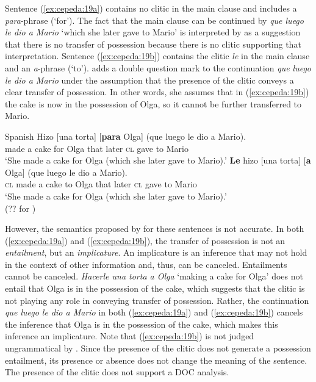 \documentclass[output=paper,colorlinks,citecolor=brown]{./langscibook}
\begin{document}
Sentence (\ref{ex:cepeda:19a}) contains no clitic in the main clause and includes a \textit{para}-phrase (‘for’). The fact that the main clause can be continued by \textit{que luego le dio a Mario} ‘which she later gave to Mario’ is interpreted by \citeauthor{Demonte1995} as a suggestion that there is no transfer of possession because there is no clitic supporting that interpretation. Sentence (\ref{ex:cepeda:19b}) contains the clitic \textit{le} in the main clause and an \textit{a}-phrase (‘to’). \citeauthor{Demonte1995} adds a double question mark to the continuation \textit{que luego le dio a Mario} under the assumption that the presence of the clitic conveys a clear transfer of possession. In other words, she assumes that in (\ref{ex:cepeda:19b}) the cake is now in the possession of Olga, so it cannot be further transferred to Mario.

\ea%
    \label{ex:cepeda:19} 
    Spanish
	\ea\label{ex:cepeda:19a}
	\gll Hizo [una torta] [\textbf{para} Olga] (que luego le   dio   a  Mario).\\
		made \hspaceThis{[}a cake \hspaceThis{[}for Olga that  later \textsc{cl} gave to Mario\\
	\glt ‘She made a cake for Olga (which she later gave to Mario).’
	\ex\label{ex:cepeda:19b}
	\gll  \textbf{Le}  hizo [una torta] [\textbf{a}  Olga] (que luego le  dio    a  Mario).\\
		\textsc{cl} made \hspaceThis{[}a cake \hspaceThis{[}to Olga that  later \textsc{cl} gave to Mario\\
	\glt ‘She made a cake for Olga (which she later gave to Mario).’\\
			(?? for \citeauthor{Demonte1995})
	\z
\z

However, the semantics proposed by \citeauthor{Demonte1995} for these sentences is not accurate. In both (\ref{ex:cepeda:19a}) and (\ref{ex:cepeda:19b}), the transfer of possession is not an \textit{entailment}, but an \textit{implicature}. An implicature is an inference that may not hold in the context of other information and, thus, can be canceled. Entailments cannot be canceled. \textit{Hacerle una torta a Olga} ‘making a cake for Olga’ does not entail that Olga is in the possession of the cake, which suggests that the clitic is not playing any role in conveying transfer of possession. Rather, the continuation \textit{que luego le dio a Mario} in both (\ref{ex:cepeda:19a}) and (\ref{ex:cepeda:19b}) cancels the inference that Olga is in the possession of the cake, which makes this inference an implicature. Note that (\ref{ex:cepeda:19b}) is not judged ungrammatical by \citeauthor{Demonte1995}. Since the presence of the clitic does not generate a possession entailment, its presence or absence does not change the meaning of the sentence. The presence of the clitic does not support a DOC analysis.
\end{document}
